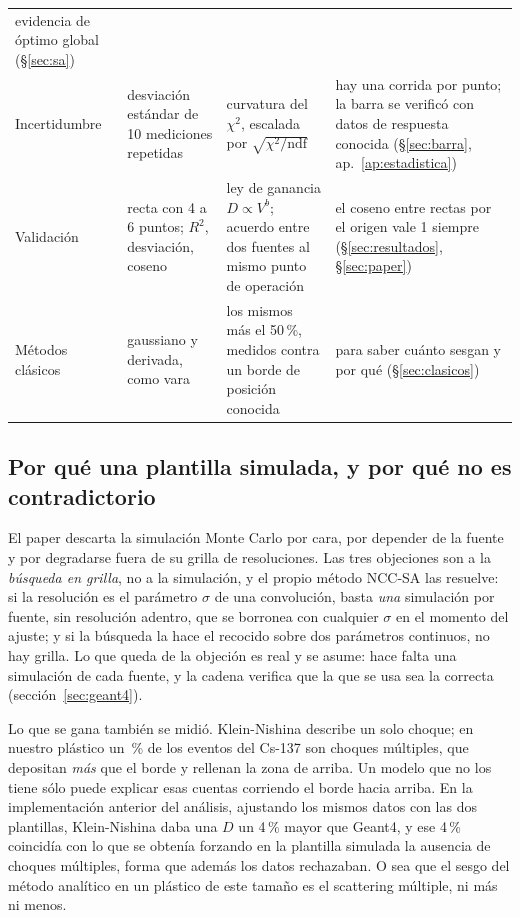 \documentclass[11pt,a4paper]{article}
\begin{document}
\begin{table}[htbp]
\begin{tabular}{@{}>{\raggedright}p{1.9cm}>{\raggedright}p{3.6cm}>{\raggedright}p{4.4cm}>{\raggedright\arraybackslash}p{5.0cm}@{}}
  evidencia de óptimo global (\S\ref{sec:sa}) \\
Incertidumbre & desviación estándar de 10 mediciones repetidas &
  curvatura del $\chi^2$, escalada por $\sqrt{\chi^2/\text{ndf}}$ &
  hay una corrida por punto; la barra se verificó con datos de respuesta
  conocida (\S\ref{sec:barra}, ap.~\ref{ap:estadistica}) \\
Validación & recta con 4 a 6 puntos; $R^2$, desviación, coseno &
  ley de ganancia $D \propto V^{b}$; acuerdo entre dos fuentes al mismo
  punto de operación &
  el coseno entre rectas por el origen vale 1 siempre
  (\S\ref{sec:resultados}, \S\ref{sec:paper}) \\
Métodos clásicos & gaussiano y derivada, como vara &
  los mismos más el 50\,\%, medidos contra un borde de posición conocida &
  para saber cuánto sesgan y por qué (\S\ref{sec:clasicos}) \\
\bottomrule
\end{tabular}
\end{table}

\subsection{Por qué una plantilla simulada, y por qué no es contradictorio}
\adaptado

El paper descarta la simulación Monte Carlo por cara, por depender de la
fuente y por degradarse fuera de su grilla de resoluciones. Las tres
objeciones son a la \emph{búsqueda en grilla}, no a la simulación, y el
propio método NCC-SA las resuelve: si la resolución es el parámetro $\sigma$
de una convolución, basta \emph{una} simulación por fuente, sin resolución
adentro, que se borronea con cualquier $\sigma$ en el momento del ajuste; y
si la búsqueda la hace el recocido sobre dos parámetros continuos, no hay
grilla. Lo que queda de la objeción es real y se asume: hace falta una
simulación de cada fuente, y la cadena verifica que la que se usa sea la
correcta (sección~\ref{sec:geant4}).

Lo que se gana también se midió. Klein-Nishina describe un solo choque; en
nuestro plástico un \SimFracMultipleCs\,\% de los eventos del Cs-137 son
choques múltiples, que depositan \emph{más} que el borde y rellenan la zona
de arriba. Un modelo que no los tiene sólo puede explicar esas cuentas
corriendo el borde hacia arriba. En la implementación anterior del análisis,
ajustando los mismos datos con las dos plantillas, Klein-Nishina daba una $D$
un 4\,\% mayor que Geant4, y ese 4\,\% coincidía con lo que se obtenía
forzando en la plantilla simulada la ausencia de choques múltiples, forma que
además los datos rechazaban. O sea que el sesgo del método analítico en un
plástico de este tamaño es el scattering múltiple, ni más ni menos.
\end{document}
